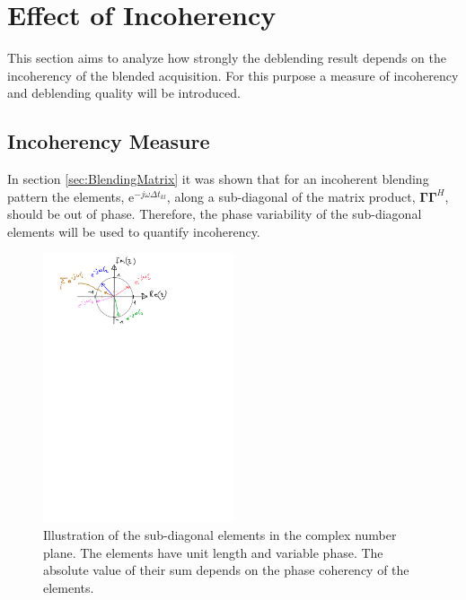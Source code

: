\section{Effect of Incoherency} \label{sec:Effect-of-Incoherency}

This section aims to analyze how strongly the deblending result depends on the incoherency of the blended acquisition. For this purpose a measure of incoherency and deblending quality will be introduced.

\subsection*{Incoherency Measure}



In section \ref{sec:BlendingMatrix} it was shown that for an incoherent blending pattern the elements, $\mathrm{e}^{-j \omega \Delta t_{kl}}$, along a sub-diagonal of the matrix product, $\mathbf{\Gamma \Gamma}^H$, should be out of phase. Therefore, the phase variability of the sub-diagonal elements will be used to quantify incoherency. 

\begin{figure}
	\centering
	\includegraphics[width = 0.5\textwidth]{Plots/complex-circle}
	\caption{Illustration of the sub-diagonal elements in the complex number plane. The elements have unit length and variable phase. The absolute value of their sum depends on the phase coherency of the elements.}
	\label{fig:Ch-Results-complex-circle}
\end{figure}

